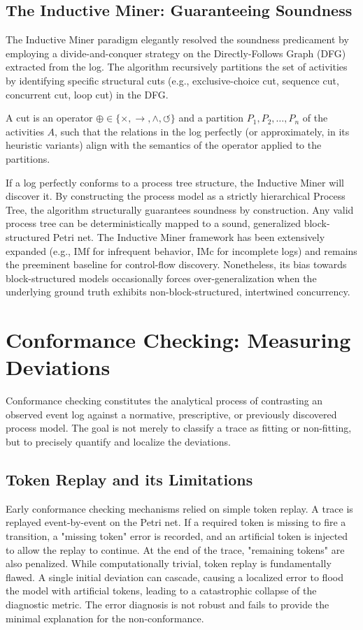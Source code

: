 \subsection{The Inductive Miner: Guaranteeing Soundness}
The Inductive Miner paradigm elegantly resolved the soundness predicament by employing a divide-and-conquer strategy on the Directly-Follows Graph (DFG) extracted from the log. The algorithm recursively partitions the set of activities by identifying specific structural cuts (e.g., exclusive-choice cut, sequence cut, concurrent cut, loop cut) in the DFG.
\begin{definition}[Cut]
A cut is an operator $\oplus \in \{\times, \rightarrow, \land, \circlearrowleft\}$ and a partition $P_1, P_2, \dots, P_n$ of the activities $A$, such that the relations in the log perfectly (or approximately, in its heuristic variants) align with the semantics of the operator applied to the partitions.
\end{definition}

If a log perfectly conforms to a process tree structure, the Inductive Miner will discover it. By constructing the process model as a strictly hierarchical Process Tree, the algorithm structurally guarantees soundness by construction. Any valid process tree can be deterministically mapped to a sound, generalized block-structured Petri net. The Inductive Miner framework has been extensively expanded (e.g., IMf for infrequent behavior, IMc for incomplete logs) and remains the preeminent baseline for control-flow discovery. Nonetheless, its bias towards block-structured models occasionally forces over-generalization when the underlying ground truth exhibits non-block-structured, intertwined concurrency.

\section{Conformance Checking: Measuring Deviations}
Conformance checking constitutes the analytical process of contrasting an observed event log against a normative, prescriptive, or previously discovered process model. The goal is not merely to classify a trace as fitting or non-fitting, but to precisely quantify and localize the deviations.

\subsection{Token Replay and its Limitations}
Early conformance checking mechanisms relied on simple token replay. A trace is replayed event-by-event on the Petri net. If a required token is missing to fire a transition, a "missing token" error is recorded, and an artificial token is injected to allow the replay to continue. At the end of the trace, "remaining tokens" are also penalized. While computationally trivial, token replay is fundamentally flawed. A single initial deviation can cascade, causing a localized error to flood the model with artificial tokens, leading to a catastrophic collapse of the diagnostic metric. The error diagnosis is not robust and fails to provide the minimal explanation for the non-conformance.

